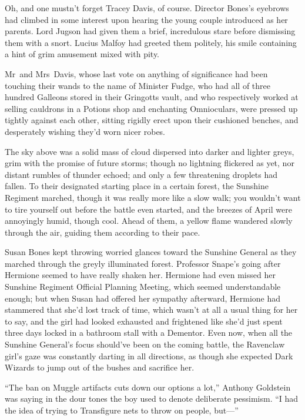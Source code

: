 Oh, and one mustn’t forget Tracey Davis, of course. Director Bones’s eyebrows
had climbed in some interest upon hearing the young couple introduced as her
parents. Lord Jugson had given them a brief, incredulous stare before
dismissing them with a snort. Lucius Malfoy had greeted them politely, his
smile containing a hint of grim amusement mixed with pity.

Mr~and Mrs~Davis, whose last vote on anything of significance had been
touching their wands to the name of Minister Fudge, who had all of three
hundred Galleons stored in their Gringotts vault, and who respectively worked
at selling cauldrons in a Potions shop and enchanting Omnioculars, were pressed
up tightly against each other, sitting rigidly erect upon their cushioned
benches, and desperately wishing they’d worn nicer robes.

The sky above was a solid mass of cloud dispersed into darker and lighter
greys, grim with the promise of future storms; though no lightning flickered as
yet, nor distant rumbles of thunder echoed; and only a few threatening droplets
had fallen.
\later
To their designated starting place in a certain forest, the Sunshine Regiment
marched, though it was really more like a slow walk; you wouldn’t want to tire
yourself out before the battle even started, and the breezes of April were
annoyingly humid, though cool. Ahead of them, a yellow flame wandered slowly
through the air, guiding them according to their pace.

Susan Bones kept throwing worried glances toward the Sunshine General as they
marched through the greyly illuminated forest. Professor Snape’s going after
Hermione seemed to have really shaken her. Hermione had even missed her
Sunshine Regiment Official Planning Meeting, which seemed understandable
enough; but when Susan had offered her sympathy afterward, Hermione had
stammered that she’d lost track of time, which wasn’t at all a usual thing for
her to say, and the girl had looked exhausted and frightened like she’d just
spent three days locked in a bathroom stall with a Dementor. Even now, when all
the Sunshine General’s focus should’ve been on the coming battle, the Ravenclaw
girl’s gaze was constantly darting in all directions, as though she expected
Dark Wizards to jump out of the bushes and sacrifice her.

“The ban on Muggle artifacts cuts down our options a lot,” Anthony Goldstein
was saying in the dour tones the boy used to denote deliberate pessimism. “I
had the idea of trying to Transfigure nets to throw on people, but—”


